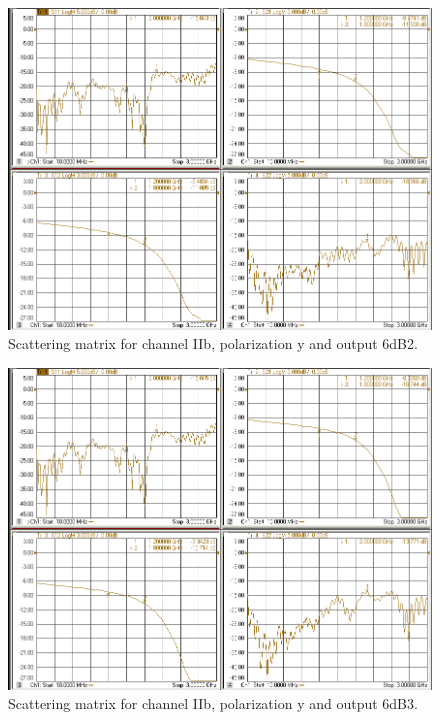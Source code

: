 \documentclass[12pt,a4paper,oneside]{article}
\begin{document}
\begin{figure}[H]
\centering
\includegraphics[width=0.9\linewidth]{VNA_results/IIby_6dB2.png}
\caption{Scattering matrix for channel IIb, polarization y and output 6dB2.}
\label{fig:IIby_6dB2}
\end{figure}


\begin{figure}[H]
\centering
\includegraphics[width=0.9\linewidth]{VNA_results/IIby_6dB3.png}
\caption{Scattering matrix for channel IIb, polarization y and output 6dB3.}
\label{fig:IIby_6dB3}
\end{figure}
\end{document}
